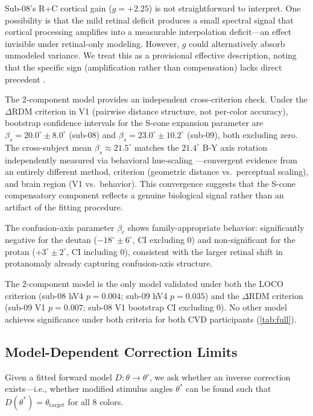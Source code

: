 \documentclass{article}
\begin{document}
Sub-08's R+C cortical gain ($g = +2.25$) is not straightforward to interpret.
One possibility is that the mild retinal deficit produces a small spectral signal that cortical processing amplifies into a measurable interpolation deficit---an effect invisible under retinal-only modeling.
However, $g$ could alternatively absorb unmodeled variance.
We treat this as a provisional effective description, noting that the specific sign (amplification rather than compensation) lacks direct precedent \cite{placeholder_tregillus2021}.

The 2-component model provides an independent cross-criterion check.
Under the $\Delta$RDM criterion in V1 (pairwise distance structure, not per-color accuracy), bootstrap confidence intervals for the S-cone expansion parameter are $\beta_s = 20.0^\circ \pm 8.0^\circ$ (sub-08) and $\beta_s = 23.0^\circ \pm 10.2^\circ$ (sub-09), both excluding zero.
The cross-subject mean $\beta_s \approx 21.5^\circ$ matches the $21.4^\circ$ B-Y axis rotation independently measured via behavioral hue-scaling \cite{placeholder_emery2021}---convergent evidence from an entirely different method, criterion (geometric distance vs.\ perceptual scaling), and brain region (V1 vs.\ behavior).
This convergence suggests that the S-cone compensatory component reflects a genuine biological signal rather than an artifact of the fitting procedure.

The confusion-axis parameter $\beta_c$ shows family-appropriate behavior: significantly negative for the deutan ($-18^\circ \pm 6^\circ$, CI excluding 0) and non-significant for the protan ($+3^\circ \pm 2^\circ$, CI including 0), consistent with the larger retinal shift in protanomaly already capturing confusion-axis structure.

The 2-component model is the only model validated under both the LOCO criterion (sub-08 hV4 $p = 0.004$; sub-09 hV4 $p = 0.035$) and the $\Delta$RDM criterion (sub-09 V1 $p = 0.007$; sub-08 V1 bootstrap CI excluding 0).
No other model achieves significance under both criteria for both CVD participants (\cref{tab:full}).

\subsection{Model-Dependent Correction Limits}

Given a fitted forward model $D\!: \theta \to \theta'$, we ask whether an inverse correction exists---i.e., whether modified stimulus angles $\theta^*$ can be found such that $D(\theta^*) = \theta_{\text{target}}$ for all 8 colors.
\end{document}
